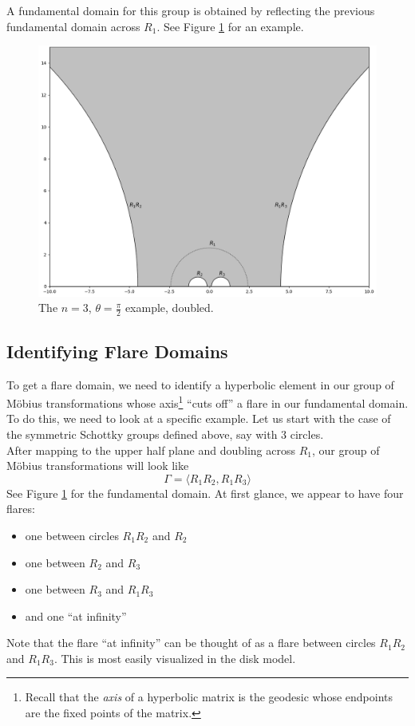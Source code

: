 \documentclass[]{article}
\begin{document}
A fundamental domain for this group is obtained by reflecting the previous fundamental domain across $R_1$.
See Figure \ref{doubled_FD} for an example.

\begin{figure}[h]
	\centering
	\includegraphics[width=\linewidth]{doubled_FD.png}
	\caption{The $n = 3$, $\theta = \frac{\pi}{2}$ example, doubled.}
	\label{doubled_FD}
\end{figure}

\subsection*{Identifying Flare Domains}

To get a flare domain, we need to identify a hyperbolic element in our group of M\"obius transformations whose axis\footnote{Recall that the \textit{axis} of a hyperbolic matrix is the geodesic whose endpoints are the fixed points of the matrix.} ``cuts off'' a flare in our fundamental domain.
To do this, we need to look at a specific example.
Let us start with the case of the symmetric Schottky groups defined above, say with 3 circles.
\\

After mapping to the upper half plane and doubling across $R_1$, our group of M\"obius transformations will look like
$$
\Gamma = \langle R_1R_2, R_1R_3 \rangle
$$
See Figure \ref{doubled_FD} for the fundamental domain.
At first glance, we appear to have four flares:
\begin{itemize}
	\item one between circles $R_1R_2$ and $R_2$
	\item one between $R_2$ and $R_3$
	\item one between $R_3$ and $R_1R_3$
	\item and one ``at infinity''
\end{itemize}
Note that the flare ``at infinity'' can be thought of as a flare between circles $R_1R_2$ and $R_1R_3$.
This is most easily visualized in the disk model.
\\
\end{document}
